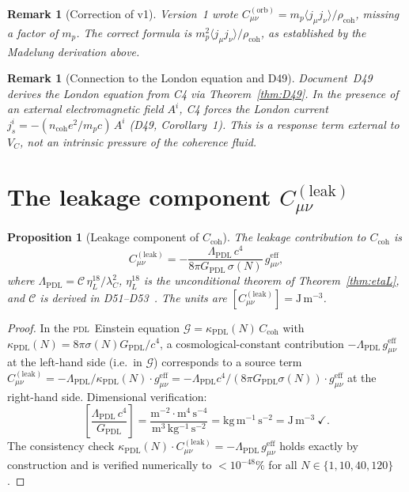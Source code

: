 \documentclass[12pt,a4paper]{article}
\newtheorem{proposition}[theorem]{Proposition}
\newtheorem{remark}[theorem]{Remark}
\newcommand{\PDL}{\textsc{pdl}}
\newcommand{\Ccoh}{C_{\mathrm{coh}}}
\newcommand{\Corb}{C^{(\mathrm{orb})}}
\newcommand{\Cleak}{C^{(\mathrm{leak})}}
\newcommand{\rhocoh}{\rho_{\mathrm{coh}}}
\newcommand{\sig}{\sigma}
\newcommand{\kPDL}{\kappa_{\mathrm{PDL}}}
\newcommand{\GPDL}{G_{\mathrm{PDL}}}
\newcommand{\geff}{g_{\mu\nu}^{\mathrm{eff}}}
\newcommand{\lambdaC}{\lambda_C}
\newcommand{\VC}{V_C}
\newcommand{\etaL}{\eta_L}
\newcommand{\LambdaPDL}{\Lambda_{\mathrm{PDL}}}
\begin{document}
\begin{remark}[Correction of v1]
Version~1 wrote $\Corb_{\mu\nu} = m_p\langle j_\mu j_\nu\rangle/\rhocoh$, missing a factor of $m_p$. The correct formula is $m_p^2\langle j_\mu j_\nu\rangle/\rhocoh$, as established by the Madelung derivation above.
\end{remark}

\begin{remark}[Connection to the London equation and D49]
Document~D49~\cite{PDL_D49_2026} derives the London equation from C4 via Theorem~\ref{thm:D49}. In the presence of an external electromagnetic field $A^i$, C4 forces the London current $j^i_s = -(n_{\mathrm{coh}}e^2/m_p c)\,A^i$ (D49, Corollary~1). This is a response term external to $\VC$, not an intrinsic pressure of the coherence fluid.
\end{remark}

\section{The leakage component \texorpdfstring{$\Cleak_{\mu\nu}$}{C(leak)}}
\label{sec:Cleak}

\begin{proposition}[Leakage component of $\Ccoh$]
\label{prop:Cleak}
The leakage contribution to $\Ccoh$ is
\begin{equation}
\Cleak_{\mu\nu} = -\frac{\LambdaPDL\,c^4}{8\pi\GPDL\,\sig(N)}\,\geff,
\label{eq:Cleak}
\end{equation}
where $\LambdaPDL = \mathcal{C}\,\etaL^{18}/\lambdaC^2$, $\etaL^{18}$ is the unconditional theorem of Theorem~\ref{thm:etaL}, and $\mathcal{C}$ is derived in D51--D53~\cite{PDL_D51_2026,PDL_D52_2026,PDL_D53_2026}. The units are $[\Cleak_{\mu\nu}] = \mathrm{J\,m^{-3}}$.
\end{proposition}

\begin{proof}
In the \PDL\ Einstein equation $\mathcal{G} = \kPDL(N)\,\Ccoh$ with $\kPDL(N) = 8\pi\sig(N)\GPDL/c^4$, a cosmological-constant contribution $-\LambdaPDL\,\geff$ at the left-hand side (i.e.\ in $\mathcal{G}$) corresponds to a source term $\Cleak_{\mu\nu} = -\LambdaPDL/\kPDL(N)\cdot\geff = -\LambdaPDL c^4/(8\pi\GPDL\sig(N))\cdot\geff$ at the right-hand side. Dimensional verification:
\begin{equation}
\left[\frac{\LambdaPDL\,c^4}{\GPDL}\right] = \frac{\mathrm{m^{-2}}\cdot\mathrm{m^4\,s^{-4}}}{\mathrm{m^3\,kg^{-1}\,s^{-2}}} = \mathrm{kg\,m^{-1}\,s^{-2}} = \mathrm{J\,m^{-3}}\ \checkmark.
\end{equation}
The consistency check $\kPDL(N)\cdot\Cleak_{\mu\nu} = -\LambdaPDL\,\geff$ holds exactly by construction and is verified numerically to $<10^{-48}\%$ for all $N\in\{1,10,40,120\}$.
\end{proof}
\end{document}
